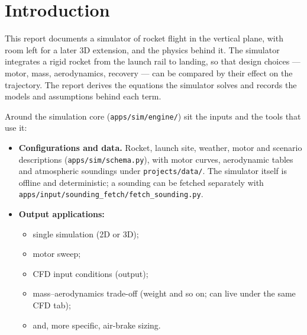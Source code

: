 \section{Introduction}\label{sec:introduction}
This report documents a simulator of rocket flight in the vertical plane, with room left for a
later 3D extension, and the physics behind it. The simulator integrates a rigid rocket from the
launch rail to landing, so that design choices --- motor, mass, aerodynamics, recovery --- can be
compared by their effect on the trajectory. The report derives the equations the simulator solves
and records the models and assumptions behind each term.

Around the simulation core (\texttt{apps/sim/engine/}) sit the inputs and the tools that use it:
\begin{itemize}
    \item \textbf{Configurations and data.} Rocket, launch site, weather, motor and scenario
    descriptions (\texttt{apps/sim/schema.py}), with motor curves, aerodynamic tables and atmospheric
    soundings under \texttt{projects/data/}. The simulator itself is offline and deterministic; a sounding
    can be fetched separately with \texttt{apps/input/sounding\_fetch/fetch\_sounding.py}.
    \item \textbf{Output applications:}
    \begin{itemize}
        \item single simulation (2D or 3D);
        \item motor sweep;
        \item CFD input conditions (output);
        \item mass--aerodynamics trade-off (weight and so on; can live under the same CFD tab);
        \item and, more specific, air-brake sizing.
    \end{itemize}
\end{itemize}

